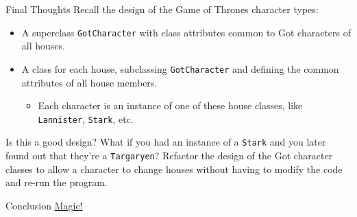 \documentclass[smaller]{beamer}
\begin{document}
\begin{frame}[fragile,label=sec-1-11]{Final Thoughts}
 Recall the design of the Game of Thrones character types:

\begin{itemize}
\item A superclass \verb~GotCharacter~ with class attributes common to Got characters of all houses.
\item A class for each house, subclassing \verb~GotCharacter~ and defining the common attributes of all house members.
\begin{itemize}
\item Each character is an instance of one of these house classes, like \verb~Lannister~, \verb~Stark~, etc.
\end{itemize}
\end{itemize}

Is this a good design? What if you had an instance of a \verb~Stark~ and you later found out that they're a \verb~Targaryen~? Refactor the design of the Got character classes to allow a character to change houses without having to modify the code and re-run the program.
\end{frame}


\begin{frame}[label=sec-1-12]{Conclusion}
\href{https://www.youtube.com/embed/az5qOjhsang}{Magic!}
\end{frame}
\end{document}
